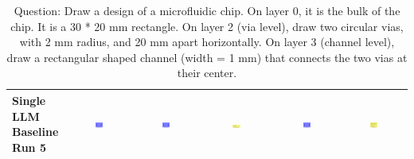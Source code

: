 \begin{table}
\begin{tabular}{@{}lccccc@{}}
    \makecell{Single LLM \\ Baseline \\ Run 5} & \includegraphics[width=0.13\textwidth]{./run_5/png/gpt-4o_results/MicrofluidicChip.png} & \includegraphics[width=0.13\textwidth]{./run_5/png/o1-preview_results/MicrofluidicChip.png} & \includegraphics[width=0.13\textwidth]{./run_5/png/claude-3-5-sonnet-20240620_results/MicrofluidicChip.png} & \includegraphics[width=0.13\textwidth]{./run_5/png/watsonx_meta-llama_llama-3-1-70b-instruct_results/MicrofluidicChip.png} & \includegraphics[width=0.13\textwidth]{./run_5/png/watsonx_meta-llama_llama-3-405b-instruct_results/MicrofluidicChip.png} \\
    \bottomrule
  \end{tabular}
  \caption*{Question: Draw a design of a microfluidic chip. On layer 0, it is the bulk of the chip. It is a 30 * 20 mm rectangle. On layer 2 (via level), draw two circular vias, with 2 mm radius, and 20 mm apart horizontally. On layer 3 (channel level), draw a rectangular shaped channel (width = 1 mm) that connects the two vias at their center.}
\end{table}

